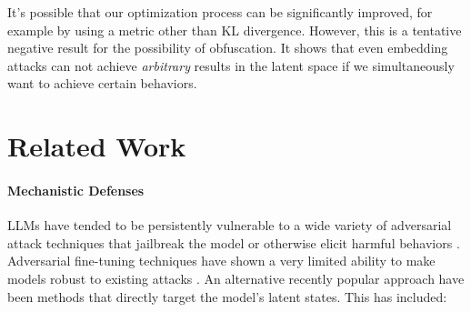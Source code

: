 \documentclass{article}
\begin{document}
It's possible that our optimization process can be significantly improved, for example by using a metric other than KL divergence. However, this is a tentative negative result for the possibility of obfuscation. It shows that even embedding attacks can not achieve \emph{arbitrary} results in the latent space if we simultaneously want to achieve certain behaviors.

\section{Related Work}\label{sec:related-work}


\paragraph{Mechanistic Defenses} 
LLMs have tended to be persistently vulnerable to a wide variety of adversarial attack techniques that jailbreak the model or otherwise elicit harmful behaviors \citep{carlini2024aligned, shayegani2023survey, andriushchenko2024jailbreaking, lucki2024adversarial, geiping2024coercing}.
Adversarial fine-tuning techniques have shown a very limited ability to make models robust to existing attacks \citep{anwar2024foundational}.
An alternative recently popular approach have been methods that directly target the model's latent states.
This has included:
\end{document}
